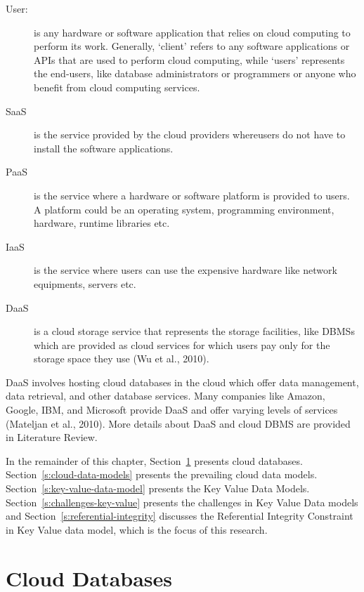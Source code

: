 \begin{description}

\item [User:] is any hardware or software application that relies on cloud
computing to perform its work. Generally, ‘client' refers to any software applications or
\acp{API}  that are used to perform cloud computing,
while ‘users' represents the end-users, like  database administrators or
programmers or anyone who benefit from cloud computing services.

\item [\acf{SaaS}] is the service provided by the cloud
providers whereusers do not have to install the software applications.

\item [\acf{PaaS}] is the service where a hardware or
software platform is provided to users. A platform could be an operating system,
programming environment, hardware, runtime libraries etc.

\item [\acf{IaaS}] is the service where users can use
the expensive hardware like network equipments, servers etc.

\item [\acf{DaaS}] is a cloud storage service  that represents
the storage facilities, like  \acp{DBMS} which are provided
as cloud services for which users pay only for the storage space they use (Wu et
al., 2010).

\end{description}


\ac{DaaS} involves hosting cloud databases in the cloud which offer data
management, data retrieval, and other database services. Many companies like
Amazon, Google, IBM, and Microsoft provide \ac{DaaS} and offer varying levels of
services (Mateljan et al., 2010). More details about \ac{DaaS} and cloud
\ac{DBMS} are provided in Literature Review.

In the remainder of this chapter, Section~\ref{s:cloud-databases} presents cloud
databases. Section~\ref{s:cloud-data-models} presents the prevailing cloud data
models. Section~\ref{s:key-value-data-model} presents the Key Value Data Models.
Section~\ref{s:challenges-key-value} presents the challenges in Key Value Data
models and Section~\ref{s:referential-integrity} discusses the Referential
Integrity Constraint in Key Value data model, which is the focus of this research.


\section{Cloud Databases}\label{s:cloud-databases}

